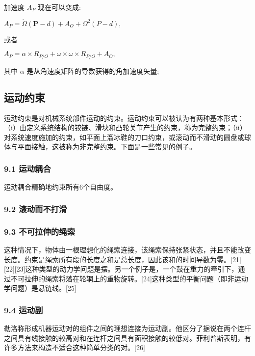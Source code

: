 加速度 $A_P$ 现在可以变成:

$A_P = \dot{\Omega} (\mathbf{P} - d) + A_O + \Omega^2 (P - d),$

或者

$A_P = \alpha \times R_{P/O} + \omega \times \omega \times R_{P/O} + A_O,$

其中 $\alpha$ 是从角速度矩阵的导数获得的角加速度矢量;



\subsection{运动约束}

运动约束是对机械系统部件运动的约束。运动约束可以被认为有两种基本形式：（i）由定义系统结构的铰链、滑块和凸轮关节产生的约束，称为完整约束；（ii）对系统速度施加的约束，如平面上溜冰鞋的刀口约束，或滚动而不滑动的圆盘或球体与平面接触，这被称为非完整约束。下面是一些常见的例子。

\subsubsection{9.1 运动耦合}

运动耦合精确地约束所有6个自由度。

\subsubsection{9.2 滚动而不打滑}



\subsubsection{9.3 不可拉伸的绳索}

这种情况下，物体由一根理想化的绳索连接，该绳索保持张紧状态，并且不能改变长度。约束是绳索所有段的长度之和是总长度，因此该和的时间导数为零。[21][22][23]这种类型的动力学问题是摆。另一个例子是，一个鼓在重力的牵引下，通过不可拉伸的绳索将落在轮辋上的重物旋转。[24]这种类型的平衡问题（即非运动学问题）是悬链线。[25]

\subsubsection{9.4 运动副}

勒洛称形成机器运动对的组件之间的理想连接为运动副。他区分了据说在两个连杆之间具有线接触的较高对和在连杆之间具有面积接触的较低对。菲利普斯表明，有许多方法来构造不适合这种简单分类的对。[26]

